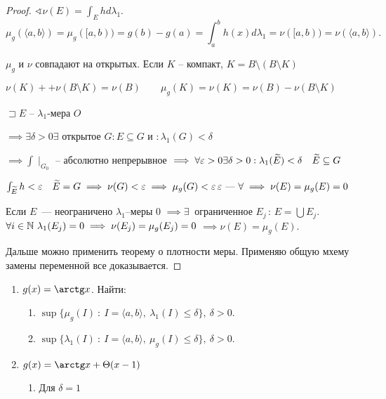 \begin{proof}
    $\sphericalangle \nu (E) = \int_E h d \lambda_1$. 
    \[\mu_g (\langle a, b \rangle )= \mu_g ([a, b)) = g(b) - g(a) = \int_a^b h(x) d \lambda_1 = \nu([a, b)) = \nu(\langle a, b \rangle ). \]

    $\mu_g$ и $\nu$ совпадают на открытых. Если $K$ -- компакт, $K = B \setminus \left( B \setminus K  \right) $

    $\nu(K) + + \nu(B \setminus K) = \nu(B)\qquad \mu_g(K) = \nu(K) = \nu(B) - \nu(B \setminus K)$

    $\sqsupset E$ -- $\lambda_1$-мера $O$

    $ \implies \exists \delta >0 \exists $ открытое $G: E\subseteq G$ и $:\lambda_1(G) <\delta$
    
    
    $\implies \int\mid_{G_0}$ -- абсолютно непрерывное $\implies \forall \varepsilon>0 \exists \delta>0: \lambda_1(\widetilde{E})<\delta\quad \widetilde{E} \subseteq G$
    
    $\int_{\widetilde{E}}h < \varepsilon\quad \widetilde{E} = G \implies \nu(G) <\varepsilon \implies \mu_g(G) <\varepsilon\,\varepsilon\text{ --- } \forall  \implies \nu(E) = \mu_g(E) = 0$   

    Если $E$~--- неограничено $\lambda_1$--меры 0 $\implies \exists~$ ограниченное $E_j\,:\,E=\bigcup E_j$.
    $\forall i \in \mathbb{N} ~ \lambda_1 (E_j) = 0 \implies \nu(E_j) =\mu_g (E_j) = 0$ $\implies \nu(E) = \mu_g (E).$

    Дальше можно применить теорему о плотности меры. Применяю общую мхему замены переменной все доказывается. 
\end{proof}
\begin{problem}
    \begin{enumerate}
        \item $g(x) = \arctg x$. Найти:
        \begin{enumerate}
            \item $\sup \Bigg\{ \mu_g(I)~:~ I = \langle a, b \rangle,~ \lambda_1 (I) \leqslant \delta \Bigg\},~ \delta > 0$.
            \item $\sup \Bigg\{ \lambda_1(I)~:~ I = \langle a, b \rangle,~ \mu_g (I) \leqslant \delta \Bigg\},~ \delta > 0$.
        \end{enumerate}
        \item $g(x) = \arctg x + \Theta(x - 1)$
        \begin{enumerate}
            \item Для $\delta = 1$
        \end{enumerate}  
    \end{enumerate}
\end{problem}
